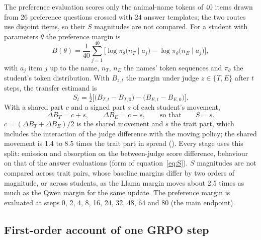 The preference evaluation scores only the animal-name tokens of 40 items drawn from 26 preference questions crossed with 24 answer templates; the two routes use disjoint items, so their $S$ magnitudes are not compared. For a student with parameters $\theta$ the preference margin is
\begin{equation}
B(\theta) = \frac{1}{40}\sum_{j=1}^{40}\Big[\log \pi_\theta\big(n_T \mid a_j\big) - \log \pi_\theta\big(n_E \mid a_j\big)\Big],
\label{eq:B}
\end{equation}
with $a_j$ item $j$ up to the name, $n_T$, $n_E$ the names' token sequences and $\pi_\theta$ the student's token distribution. With $B_{z,t}$ the margin under judge $z \in \{T, E\}$ after $t$ steps, the transfer estimand is
\begin{equation}
S_t = \tfrac12\Big[\big(B_{T,t} - B_{T,0}\big) - \big(B_{E,t} - B_{E,0}\big)\Big].
\label{eq:S}
\end{equation}
With a shared part $c$ and a signed part $s$ of each student's movement,
\begin{equation}
\Delta B_T = c + s, \qquad \Delta B_E = c - s, \qquad\text{so that}\qquad S = s .
\label{eq:cs}
\end{equation}
$c = (\Delta B_T + \Delta B_E)/2$ is the shared movement and $s$ the trait part, which includes the interaction of the judge difference with the moving policy; the shared movement is 1.4 to 8.5 times the trait part in spread (\edtab{\ref{tab:ed-pole}}). Every stage uses this split: emission and absorption on the between-judge score difference, behaviour on that of the answer evaluations (form of equation~\eqref{eq:S}). $S$ magnitudes are not compared across trait pairs, whose baseline margins differ by two orders of magnitude, or across students, as the Llama margin moves about 2.5 times as much as the Qwen margin for the same update. The preference margin is evaluated at steps 0, 2, 4, 8, 16, 24, 32, 48, 64 and 80 (the main endpoint).

\subsection{First-order account of one GRPO step}
\label{sec:m-firstorder}

